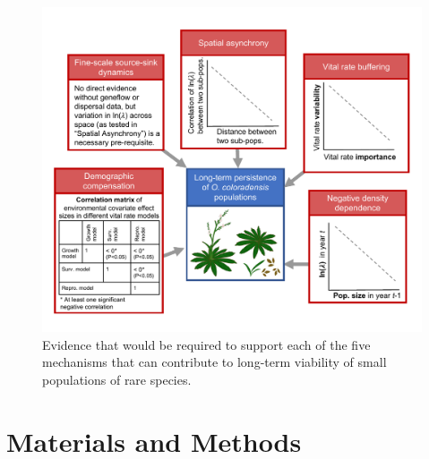 \documentclass[12pt, letterpaper]{article}
\begin{document}
\begin{figure}[h!]
  \centering
  \includegraphics[width=1\textwidth]{COBP_conceptualDiagram.pdf}
  \caption{
  \internallinenumbers Evidence that would be required to support each of the five mechanisms that can contribute to long-term viability of small populations of rare species.}
  \label{fig:conceptualFigure}
\end{figure} 

\section{Materials and Methods}
\end{document}
